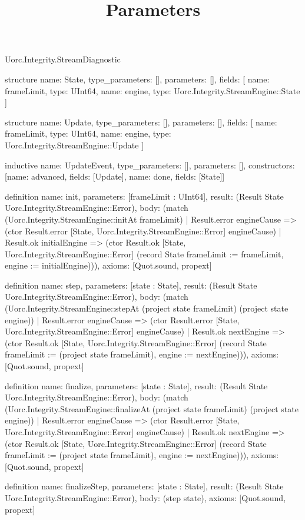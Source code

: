 \begin{lexlean}{Uorc.Integrity.StreamDiagnostic}
\title{Parameters}
\begin{semanticmodule}
structure{
  name: State,
  type_parameters: [],
  parameters: [],
  fields: [
    {name: frameLimit, type: UInt64},
    {name: engine, type: Uorc.Integrity.StreamEngine::State}
  ]
}

structure{
  name: Update,
  type_parameters: [],
  parameters: [],
  fields: [
    {name: frameLimit, type: UInt64},
    {name: engine, type: Uorc.Integrity.StreamEngine::Update}
  ]
}

inductive{
  name: UpdateEvent,
  type_parameters: [],
  parameters: [],
  constructors: [{name: advanced, fields: [Update]}, {name: done, fields: [State]}]
}

definition{
  name: init,
  parameters: [frameLimit : UInt64],
  result: (Result State Uorc.Integrity.StreamEngine::Error),
  body: (match (Uorc.Integrity.StreamEngine::initAt frameLimit)
    | Result.error engineCause => (ctor Result.error [State, Uorc.Integrity.StreamEngine::Error] engineCause)
    | Result.ok initialEngine => (ctor Result.ok [State, Uorc.Integrity.StreamEngine::Error] (record State {frameLimit := frameLimit, engine := initialEngine}))),
  axioms: [Quot.sound, propext]
}

definition{
  name: step,
  parameters: [state : State],
  result: (Result State Uorc.Integrity.StreamEngine::Error),
  body: (match (Uorc.Integrity.StreamEngine::stepAt (project state frameLimit) (project state engine))
    | Result.error engineCause => (ctor Result.error [State, Uorc.Integrity.StreamEngine::Error] engineCause)
    | Result.ok nextEngine => (ctor Result.ok [State, Uorc.Integrity.StreamEngine::Error] (record State {frameLimit := (project state frameLimit), engine := nextEngine}))),
  axioms: [Quot.sound, propext]
}

definition{
  name: finalize,
  parameters: [state : State],
  result: (Result State Uorc.Integrity.StreamEngine::Error),
  body: (match (Uorc.Integrity.StreamEngine::finalizeAt (project state frameLimit) (project state engine))
    | Result.error engineCause => (ctor Result.error [State, Uorc.Integrity.StreamEngine::Error] engineCause)
    | Result.ok nextEngine => (ctor Result.ok [State, Uorc.Integrity.StreamEngine::Error] (record State {frameLimit := (project state frameLimit), engine := nextEngine}))),
  axioms: [Quot.sound, propext]
}

definition{
  name: finalizeStep,
  parameters: [state : State],
  result: (Result State Uorc.Integrity.StreamEngine::Error),
  body: (step state),
  axioms: [Quot.sound, propext]
}


\end{semanticmodule}
\end{lexlean}
